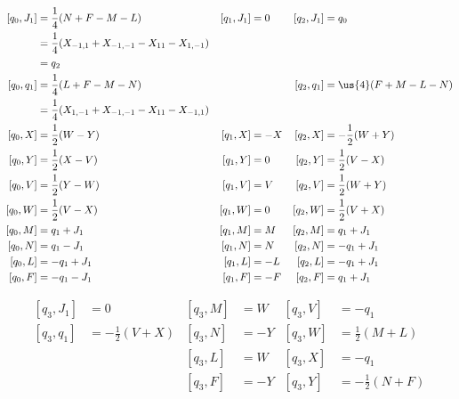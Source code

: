 \begin{subequations}
	\begin{align}
		[q_0,J_1] & =\frac{1}{4}(N+F-M-L)                                & [q_1,J_1] & =0  & [q_2,J_1] & =q_0               \\
		          & =\frac{1}{ 4 }(X_{-1,1}+X_{-1,-1}-X_{11}-X_{1,-1})                                                      \\
		          & =q_2                                                                                                    \\
		[q_0,q_1] & =\frac{1}{4}(L+F-M-N)                                &           &     & [q_2,q_1] & =\us{4}(F+M-L-N)   \\
		          & =\frac{ 1 }{ 4 }(X_{1,-1}+X_{-1,-1}-X_{11}-X_{-1,1})                                                    \\
		[q_0,X]   & =\frac{1}{2}(W-Y)                                    & [q_1,X]   & =-X & [q_2,X]   & =-\frac{1}{2}(W+Y) \\
		[q_0,Y]   & =\frac{1}{2}(X-V)                                    & [q_1,Y]   & =0  & [q_2,Y]   & =\frac{1}{2}(V-X)  \\
		[q_0,V]   & =\frac{1}{2}(Y-W)                                    & [q_1,V]   & =V  & [q_2,V]   & =\frac{1}{2}(W+Y)  \\
		[q_0,W]   & =\frac{1}{2}(V-X)                                    & [q_1,W]   & =0  & [q_2,W]   & =\frac{1}{2}(V+X)  \\
		[q_0,M]   & =q_1+J_1                                             & [q_1,M]   & =M  & [q_2,M]   & =q_1+J_1           \\
		[q_0,N]   & =q_1-J_1                                             & [q_1,N]   & =N  & [q_2,N]   & =-q_1+J_1          \\
		[q_0,L]   & =-q_1+J_1                                            & [q_1,L]   & =-L & [q_2,L]   & =-q_1+J_1          \\
		[q_0,F]   & =-q_1-J_1                                            & [q_1,F]   & =-F & [q_2,F]   & =q_1+J_1
	\end{align}
\end{subequations}

\begin{subequations}
	\begin{align}
		[q_3,J_1] & =0                 & [q_3,M] & =W  & [q_3,V] & =-q_1              \\
		[q_3,q_1] & =-\frac{1}{2}(V+X) & [q_3,N] & =-Y & [q_3,W] & =\frac{1}{2}(M+L)  \\
		          &                    & [q_3,L] & =W  & [q_3,X] & =-q_1              \\
		          &                    & [q_3,F] & =-Y & [q_3,Y] & =-\frac{1}{2}(N+F)
	\end{align}
\end{subequations}

